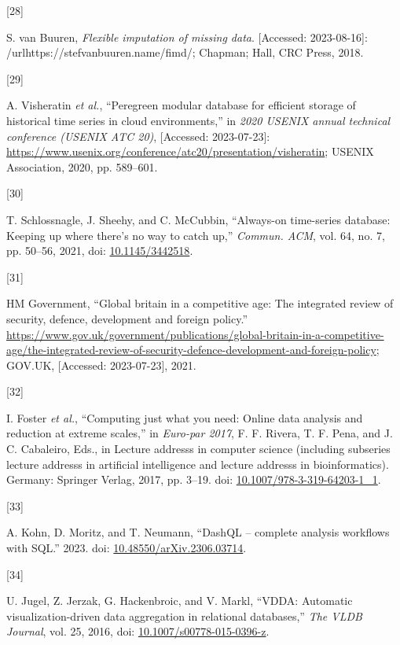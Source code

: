 \documentclass{article}
\newlength{\cslhangindent}
\newlength{\csllabelwidth}
\newlength{\cslentryspacingunit} %
\newenvironment{CSLReferences}[2] %
 {%
  \setlength{\parindent}{0pt}
  \ifodd #1
  \let\oldpar\par
  \def\par{\hangindent=\cslhangindent\oldpar}
  \fi
  \setlength{\parskip}{#2\cslentryspacingunit}
 }%
 {}
\newcommand{\CSLLeftMargin}[1]{\parbox[t]{\csllabelwidth}{#1}}
\newcommand{\CSLRightInline}[1]{\parbox[t]{\linewidth - \csllabelwidth}{#1}\break}
\begin{document}
\begin{CSLReferences}{0}{0}
\leavevmode{}%
\CSLLeftMargin{{[}28{]} }
\CSLRightInline{S. van Buuren, \emph{Flexible imputation of missing
data}. {[}Accessed: 2023-08-16{]}:
/url{https://stefvanbuuren.name/fimd/}; Chapman; Hall, CRC Press, 2018.}

\leavevmode{}%
\CSLLeftMargin{{[}29{]} }
\CSLRightInline{A. Visheratin \emph{et al.}, {``Peregreen {\textendash}
modular database for efficient storage of historical time series in
cloud environments,''} in \emph{2020 USENIX annual technical conference
(USENIX ATC 20)}, {[}Accessed: 2023-07-23{]}:
\url{https://www.usenix.org/conference/atc20/presentation/visheratin};
USENIX Association, 2020, pp. 589--601.}

\leavevmode{}%
\CSLLeftMargin{{[}30{]} }
\CSLRightInline{T. Schlossnagle, J. Sheehy, and C. McCubbin,
{``Always-on time-series database: Keeping up where there's no way to
catch up,''} \emph{Commun. ACM}, vol. 64, no. 7, pp. 50--56, 2021, doi:
\href{https://doi.org/10.1145/3442518}{10.1145/3442518}.}

\leavevmode{}%
\CSLLeftMargin{{[}31{]} }
\CSLRightInline{HM Government, {``Global britain in a competitive age:
The integrated review of security, defence, development and foreign
policy.''}
\url{https://www.gov.uk/government/publications/global-britain-in-a-competitive-age/the-integrated-review-of-security-defence-development-and-foreign-policy};
GOV.UK, {[}Accessed: 2023-07-23{]}, 2021.}

\leavevmode{}%
\CSLLeftMargin{{[}32{]} }
\CSLRightInline{I. Foster \emph{et al.}, {``Computing just what you
need: Online data analysis and reduction at extreme scales,''} in
\emph{Euro-par 2017}, F. F. Rivera, T. F. Pena, and J. C. Cabaleiro,
Eds., in Lecture addresss in computer science (including subseries
lecture addresss in artificial intelligence and lecture addresss in
bioinformatics). Germany: Springer Verlag, 2017, pp. 3--19. doi:
\href{https://doi.org/10.1007/978-3-319-64203-1_1}{10.1007/978-3-319-64203-1\_1}.}

\leavevmode{}%
\CSLLeftMargin{{[}33{]} }
\CSLRightInline{A. Kohn, D. Moritz, and T. Neumann, {``DashQL --
complete analysis workflows with SQL.''} 2023. doi:
\href{https://doi.org/10.48550/arXiv.2306.03714}{10.48550/arXiv.2306.03714}.}

\leavevmode{}%
\CSLLeftMargin{{[}34{]} }
\CSLRightInline{U. Jugel, Z. Jerzak, G. Hackenbroic, and V. Markl,
{``VDDA: Automatic visualization-driven data aggregation in relational
databases,''} \emph{The VLDB Journal}, vol. 25, 2016, doi:
\href{https://doi.org/10.1007/s00778-015-0396-z}{10.1007/s00778-015-0396-z}.}


\end{CSLReferences}
\end{document}
